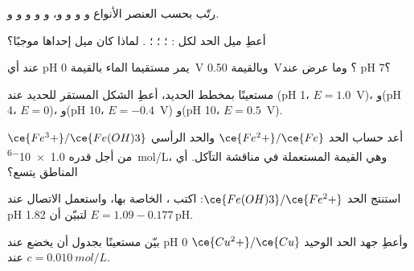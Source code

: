 \begin{exercise}[$\star$]\label{exo:b1:e-ph-diagrams:1}
رتّب بحسب  العنصر الأنواع  و
و و و، و و و
و و.
\end{exercise}

\begin{exercise}[$\star$]\label{exo:b1:e-ph-diagrams:2}
أعطِ ميل الحد لكل :
؛ ؛
؛ .
لماذا كان ميل إحداها موجبًا؟
\end{exercise}

\begin{exercise}[$\star$]\label{exo:b1:e-ph-diagrams:3}
عند أي pH يمر مستقيما الماء بالقيمة 0~V وبالقيمة
\qty{0.50}{V}؟ وما عرض  عند
pH 7؟
\end{exercise}

\begin{exercise}[$\star$]\label{exo:b1:e-ph-diagrams:4}
مستعينًا بمخطط الحديد، أعطِ الشكل المستقر للحديد عند
(pH 1، $E = 1.0$~V)، و(pH 4، $E = 0$)، و(pH 10، $E = -0.4$~V)
و(pH 10، $E = 0.5$~V).
\end{exercise}

\begin{exercise}[$\star\star$]\label{exo:b1:e-ph-diagrams:5}
أعد حساب الحد $\ce{Fe^2+}/\ce{Fe}$ والحد الرأسي
$\ce{Fe^3+}/\ce{Fe(OH)3}$ من أجل  قدره
\qty{1.0e-6}{mol/L}، وهي القيمة المستعملة في مناقشة التآكل. أي المناطق
يتسع؟
\end{exercise}

\begin{exercise}[$\star\star$]\label{exo:b1:e-ph-diagrams:6}
استنتج الحد $\ce{Fe(OH)3}/\ce{Fe^2+}$: اكتب ،
 الخاصة بها، واستعمل الاتصال عند pH 1.82 لتبيّن أن $E = 1.09 -
0.177\,\mathrm{pH}$.
\end{exercise}

\begin{exercise}[$\star\star$]\label{exo:b1:e-ph-diagrams:7}
بيّن مستعينًا بجدول  أن  يخضع 
عند pH 0 وأعطِ جهد الحد الوحيد $\ce{Cu^2+}/\ce{Cu}$
عند $c = \qty{0.010}{mol/L}$.
\end{exercise}

